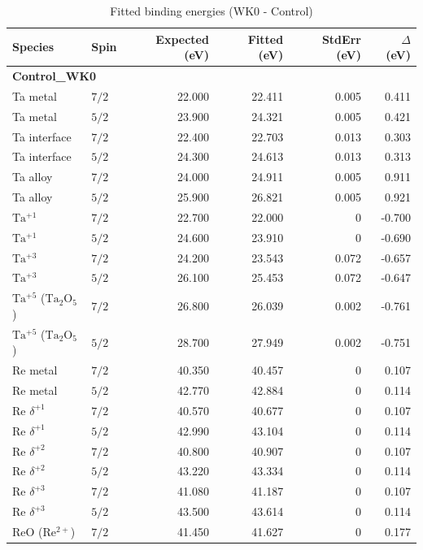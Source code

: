 \documentclass[12pt]{article}
\begin{document}
\begin{table}[H]
\centering
\begin{threeparttable}
\caption{Fitted binding energies (WK0 - Control)}
\begin{tabular}{llrrrr}
\toprule
Species & Spin & Expected (eV) & Fitted (eV) & StdErr (eV) & $\Delta$ (eV) \\
\midrule
\multicolumn{6}{l}{\textbf{Control\_WK0}} \\
Ta metal & $7/2$ & 22.000 & 22.411 & 0.005 & 0.411 \\
Ta metal & $5/2$ & 23.900 & 24.321 & 0.005 & 0.421 \\
Ta interface & $7/2$ & 22.400 & 22.703 & 0.013 & 0.303 \\
Ta interface & $5/2$ & 24.300 & 24.613 & 0.013 & 0.313 \\
Ta alloy & $7/2$ & 24.000 & 24.911 & 0.005 & 0.911 \\
Ta alloy & $5/2$ & 25.900 & 26.821 & 0.005 & 0.921 \\
$\mathrm{Ta^{+1}}$ & $7/2$ & 22.700 & 22.000 & 0 & -0.700 \\
$\mathrm{Ta^{+1}}$ & $5/2$ & 24.600 & 23.910 & 0 & -0.690 \\
$\mathrm{Ta^{+3}}$ & $7/2$ & 24.200 & 23.543 & 0.072 & -0.657 \\
$\mathrm{Ta^{+3}}$ & $5/2$ & 26.100 & 25.453 & 0.072 & -0.647 \\
$\mathrm{Ta^{+5}}$ ($\mathrm{Ta_2O_5}$) & $7/2$ & 26.800 & 26.039 & 0.002 & -0.761 \\
$\mathrm{Ta^{+5}}$ ($\mathrm{Ta_2O_5}$) & $5/2$ & 28.700 & 27.949 & 0.002 & -0.751 \\
Re metal & $7/2$ & 40.350 & 40.457 & 0 & 0.107 \\
Re metal & $5/2$ & 42.770 & 42.884 & 0 & 0.114 \\
$\mathrm{Re}$ $\delta^{+1}$ & $7/2$ & 40.570 & 40.677 & 0 & 0.107 \\
$\mathrm{Re}$ $\delta^{+1}$ & $5/2$ & 42.990 & 43.104 & 0 & 0.114 \\
$\mathrm{Re}$ $\delta^{+2}$ & $7/2$ & 40.800 & 40.907 & 0 & 0.107 \\
$\mathrm{Re}$ $\delta^{+2}$ & $5/2$ & 43.220 & 43.334 & 0 & 0.114 \\
$\mathrm{Re}$ $\delta^{+3}$ & $7/2$ & 41.080 & 41.187 & 0 & 0.107 \\
$\mathrm{Re}$ $\delta^{+3}$ & $5/2$ & 43.500 & 43.614 & 0 & 0.114 \\
$\mathrm{ReO}$ ($\mathrm{Re^{2+}}$) & $7/2$ & 41.450 & 41.627 & 0 & 0.177 \\

\end{tabular}
\end{threeparttable}
\end{table}
\end{document}
